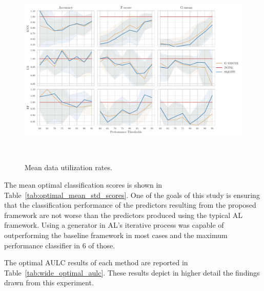 \documentclass[parskip=full]{scrartcl}
\begin{document}
\begin{figure}[H]
	\centering
	\includegraphics[width=1\linewidth]{../analysis/data_utilization_rate}
    \caption{Mean data utilization rates.}~\label{fig:dur}
\end{figure}

The mean optimal classification scores is shown in
Table~\ref{tab:optimal_mean_std_scores}. One of the goals of this study is
ensuring that the classification performance of the predictors resulting from
the proposed framework are not worse than the predictors produced using the
typical AL framework. Using a generator in AL's iterative process
was capable of outperforming the baseline framework in most cases and the
maximum performance classifier in 6 of those.


The optimal AULC results of each method are reported in
Table~\ref{tab:wide_optimal_aulc}. These results depict in higher detail the
findings drawn from this experiment.

\end{document}
